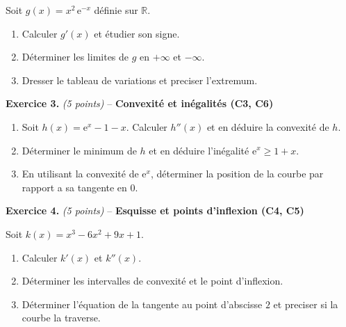 Soit $g(x) = x^2\,\mathrm{e}^{-x}$ définie sur $\mathbb{R}$.
\begin{enumerate}
  \item Calculer $g'(x)$ et étudier son signe.
  \item Déterminer les limites de $g$ en $+\infty$ et $-\infty$.
  \item Dresser le tableau de variations et preciser l'extremum.
\end{enumerate}

\bigskip

\textbf{Exercice 3.} \textit{(5 points)} -- \textbf{Convexité et inégalités (C3, C6)}

\begin{enumerate}
  \item Soit $h(x) = \mathrm{e}^x - 1 - x$. Calculer $h''(x)$ et en déduire la convexité de $h$.
  \item Déterminer le minimum de $h$ et en déduire l'inégalité $\mathrm{e}^x \geq 1 + x$.
  \item En utilisant la convexité de $\mathrm{e}^x$, déterminer la position de la courbe par rapport a sa tangente en $0$.
\end{enumerate}

\bigskip

\textbf{Exercice 4.} \textit{(5 points)} -- \textbf{Esquisse et points d'inflexion (C4, C5)}

Soit $k(x) = x^3 - 6x^2 + 9x + 1$.
\begin{enumerate}
  \item Calculer $k'(x)$ et $k''(x)$.
  \item Déterminer les intervalles de convexité et le point d'inflexion.
  \item Déterminer l'équation de la tangente au point d'abscisse $2$ et preciser si la courbe la traverse.
\end{enumerate}
